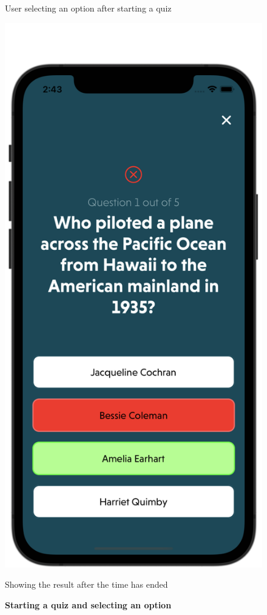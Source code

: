 \begin{figure}[H]
\begin{minipage}[b]{0.43\linewidth}
        \caption{User selecting an option after starting a quiz}
    \end{minipage}
    \hspace{0.1\linewidth}
    \begin{minipage}[b]{0.43\linewidth}
        \centering
        \includegraphics[width=\linewidth]{Mobile UI/Displaying correct result.png}
        \caption{Showing the result after the time has ended}
    \end{minipage}
    \vspace{0.5cm}
    \caption{\textbf{Starting a quiz and selecting an option}}
\end{figure}

